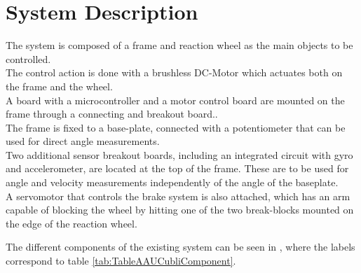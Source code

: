 \chapter{System Description}\label{systemDescription}
The system is composed of a frame and reaction wheel as the main objects to be controlled.\\
The control action is done with a brushless DC-Motor which actuates both on the frame and the wheel.\\ 
A board with a microcontroller and a motor control board are mounted on the frame through a connecting and breakout board..\\ 
The frame is fixed to a base-plate, connected with a potentiometer that can be used for direct angle measurements.\\ 
Two additional sensor breakout boards, including an integrated circuit with gyro and accelerometer, are located at the top of the frame. These are to be used for angle and velocity measurements independently of the angle of the baseplate.\\ 
A servomotor that controls the brake system is also attached, which has an arm capable of blocking the wheel by hitting one of the two break-blocks mounted on the edge of the reaction wheel.

The different components of the existing system can be seen in , where the labels correspond to table \ref{tab:TableAAUCubliComponent}.

